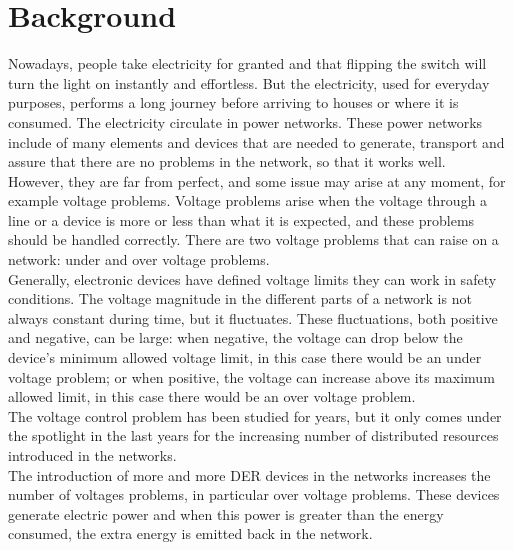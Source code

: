 \chapter{Background}


Nowadays, people take electricity for granted and that flipping the switch will turn the light on instantly and effortless. But the electricity, used for everyday purposes, performs a long journey before arriving to houses or where it is consumed. The electricity circulate in power networks. These power networks include of many elements and devices that are needed to generate, transport and assure that there are no problems in the network, so that it works well. \\
However, they are far from perfect, and some issue may arise at any moment, for example voltage problems. Voltage problems arise when the voltage through a line or a device is more or less than what it is expected, and these problems should be handled correctly. There are two voltage problems that can raise on a network: under and over voltage problems.\\
Generally, electronic devices have defined voltage limits they can work in safety conditions. The voltage magnitude in the different parts of a network is not always constant during time, but it fluctuates. These fluctuations, both positive and negative, can be large: when negative, the voltage can drop below the device's minimum allowed voltage limit, in this case there would be an under voltage problem; or when positive, the voltage can increase above its maximum allowed limit, in this case there would be an over voltage problem. \\

The voltage control problem has been studied for years, but it only comes under the spotlight in the last years for the increasing number of distributed resources introduced in the networks. \\
The introduction of more and more \gls{DER} devices in the networks increases the number of voltages problems, in particular over voltage problems. These devices generate electric power and when this power is greater than the energy consumed, the extra energy is emitted back in the network.\\ %

